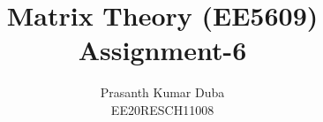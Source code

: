 \documentclass[journal,12pt,twocolumn]{IEEEtran}
\begin{document}
\makeatletter
{}
\makeatother
\let\StandardTheFigure\thefigure
\let\vec\mathbf
\renewcommand{\thefigure}{\theproblem}
\def\putbox#1#2#3{\makebox[0in][l]{\makebox[#1][l]{}\raisebox{\baselineskip}[0in][0in]{\raisebox{#2}[0in][0in]{#3}}}}
     \def\rightbox#1{\makebox[0in][r]{#1}}
     \def\centbox#1{\makebox[0in]{#1}}
     \def\topbox#1{\raisebox{-\baselineskip}[0in][0in]{#1}}
     \def\midbox#1{\raisebox{-0.5\baselineskip}[0in][0in]{#1}}
\vspace{3cm}
\title{Matrix Theory (EE5609) \\ Assignment-6}
\author{Prasanth Kumar Duba \\ EE20RESCH11008}
%
%
%
% 
%
\end{document}
